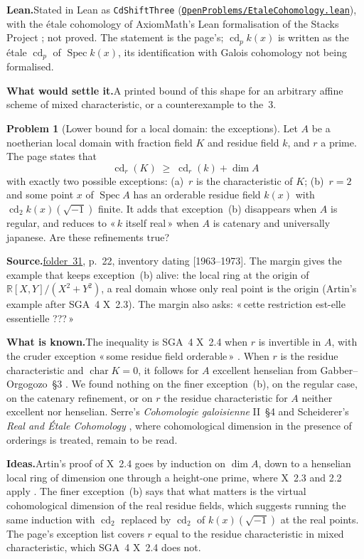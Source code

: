 \documentclass[11pt]{article}
\newcommand{\q}[1]{«\,#1\,»}
\newcommand{\fac}[1]{\href{https://grothendieck.umontpellier.fr/#1.pdf}{folder~#1}}
\newcommand{\cd}{\operatorname{cd}}
\newcommand{\Spec}{\operatorname{Spec}}
\theoremstyle{definition}
\newtheorem{problem}{Problem}
\theoremstyle{plain}\newtheorem*{proposition}{Proposition}\theoremstyle{definition}
\newcommand{\entry}[1]{\par\medskip\noindent\textbf{#1}\enspace}
\newcommand{\src}[1]{\entry{Source.}#1}
\newcommand{\known}{\entry{What is known.}}
\newcommand{\ideas}{\entry{Ideas.}}
\newcommand{\leanst}{\entry{Lean.}}
\newcommand{\leanop}[1]{\href{https://github.com/Commutator-IO/GrothendieckArchivesProofs/blob/main/OpenProblems/#1.lean}{\nolinkurl{OpenProblems/#1.lean}}}
\newcommand{\settle}{\entry{What would settle it.}}
\begin{document}
\leanst Stated in Lean as \texttt{CdShiftThree} (\leanop{EtaleCohomology}), with the étale cohomology of AxiomMath's Lean formalisation of the Stacks Project \cite{axiomstacks}; not proved. The statement is the page's; $\cd_p k(x)$ is written as the étale $\cd_p$ of $\Spec k(x)$, its identification with Galois cohomology not being formalised.

\settle A printed bound of this shape for an arbitrary affine scheme of mixed characteristic, or a counterexample to the~$3$.

\begin{problem}[Lower bound for a local domain: the exceptions]\label{p:lower}
Let $A$ be a noetherian local domain with fraction field $K$ and residue field $k$, and $r$ a prime. The page states that
\[
\cd_r(K) \;\ge\; \cd_r(k) + \dim A
\]
with exactly two possible exceptions: (a)~$r$ is the characteristic of $K$; (b)~$r = 2$ and some point $x$ of $\Spec A$ has an orderable residue field $k(x)$ with $\cd_2 k(x)(\sqrt{-1})$ finite. It adds that exception~(b) disappears when $A$ is regular, and reduces to \q{$k$ itself real} when $A$ is catenary and universally japanese. Are these refinements true?
\end{problem}

\src{\fac{31}, p.~22, inventory dating [1963--1973]. The margin gives the example that keeps exception~(b) alive: the local ring at the origin of $\mathbb R[X,Y]/(X^2+Y^2)$, a real domain whose only real point is the origin (Artin's example after SGA~4 X~2.3). The margin also asks: \q{cette restriction est-elle essentielle ???}}

\known The inequality is SGA~4 X~2.4 when $r$ is invertible in $A$, with the cruder exception \q{some residue field orderable} \cite{sga4}. When $r$ is the residue characteristic and $\operatorname{char} K = 0$, it follows for $A$ excellent henselian from Gabber--Orgogozo~\S3 \cite{gabberorgogozo}. We found nothing on the finer exception~(b), on the regular case, on the catenary refinement, or on $r$ the residue characteristic for $A$ neither excellent nor henselian. Serre's \emph{Cohomologie galoisienne} II~\S4 and Scheiderer's \emph{Real and Étale Cohomology} \cite{scheiderer}, where cohomological dimension in the presence of orderings is treated, remain to be read.

\ideas Artin's proof of X~2.4 goes by induction on $\dim A$, down to a henselian local ring of dimension one through a height-one prime, where X~2.3 and 2.2 apply \cite{sga4}. The finer exception~(b) says that what matters is the virtual cohomological dimension of the real residue fields, which suggests running the same induction with $\cd_2$ replaced by $\cd_2$ of $k(x)(\sqrt{-1})$ at the real points. The page's exception list covers $r$ equal to the residue characteristic in mixed characteristic, which SGA~4 X~2.4 does not.
\end{document}
